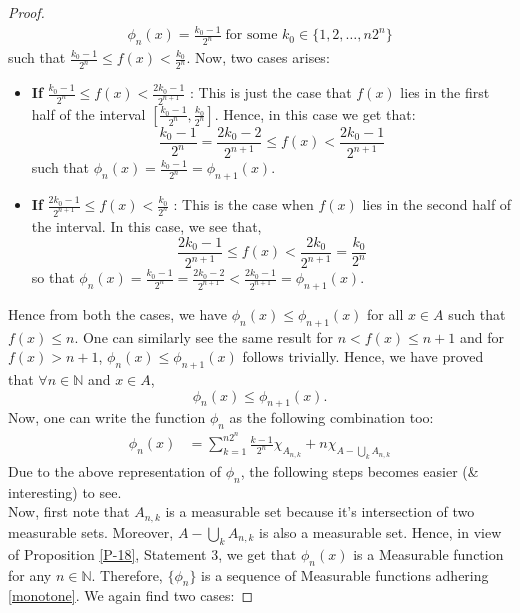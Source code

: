 \documentclass{article}
\theoremstyle{definition}
\theoremstyle{remark}
\theoremstyle{definition}
\theoremstyle{definition}
\theoremstyle{definition}
\newcommand{\bunion}{\bigcup}
\newcommand{\N}{\mathbb{N}}
\begin{document}
\begin{proof}
\begin{equation*}
		\begin{split}
			\phi_n(x) = \frac{k_0  -1}{2^n}\;\text{for some }k_0 \in \{1,2,\dots,n2^n\}
		\end{split}
	\end{equation*}
	such that $ \frac{k_0-1 }{2^n}\le f(x) < \frac{k_0}{2^n} $. Now, two cases arises:
	\begin{itemize}
		\item {\textbf{If} $ \frac{k_0-1}{2^n} \le f(x) < \frac{2k_0 -1}{2^{n+1}} $ : This is just the case that $ f(x) $ lies in the first half of the interval $ \left [\frac{k_0-1}{2^n}, \frac{k_0}{2^n}\right ] $. Hence, in this case we get that:
			\[\frac{k_0-1}{2^n} = \frac{2k_0 - 2}{2^{n+1}} \le f(x) < \frac{2k_0 - 1}{2^{n+1}}\]
			such that $ \phi_n(x) = \frac{k_0-1}{2^n} = \phi_{n+1}(x) $.	
		}
		\item {\textbf{If} $ \frac{2k_0 -1}{2^{n+1}} \le f(x) < \frac{k_0}{2^n}$ : This is the case when $ f(x) $ lies in the second half of the interval. In this case, we see that,
			\[\frac{2k_0 -1}{2^{n+1}} \le f(x) < \frac{2k_0}{2^{n+1}} = \frac{k_0}{2^{n}}\]
			so that $ \phi_n(x) = \frac{k_0 -1}{2^n} = \frac{2k_0 -2}{2^{n+1}} < \frac{2k_0 -1}{2^{n+1}} = \phi_{n+1}(x) $.
		}
	\end{itemize}
	Hence from both the cases, we have $ \phi_n(x) \le \phi_{n+1} (x) $ for all $ x \in A$ such that $ f(x)\le n $. One can similarly see the same result for $ n<f(x) \le n+1$ and for $ f(x) >n+1 $, $ \phi_n(x) \le \phi_{n+1}(x) $ follows trivially. Hence, we have proved that $ \forall n\in \N $ and $ x\in A $, 
	\begin{equation}
		\label{monotone}
		\phi_n(x) \le \phi_{n+1}(x).
	\end{equation}
	Now, one can write the function $ \phi_n $ as the following combination too:
	\begin{equation}
		\begin{split}
			\phi_n(x) &= \sum_{k=1}^{n2^n} \frac{k-1}{2^n}\chi_{A_{n,k}} + n\chi_{A - \bunion_k A_{n,k}}
		\end{split}
	\end{equation}
	Due to the above representation of $ \phi_n $, the following steps becomes easier (\& interesting) to see.\\
	Now, first note that $ A_{n,k} $ is a measurable set because it's intersection of two measurable sets. Moreover, $ A- \bunion_{k}A_{n,k} $ is also a measurable set. Hence, in view of Proposition \ref{P-18}, Statemen\textit{\textit{}}t 3, we get that $ \phi_n(x) $ is a Measurable function for any $ n\in \N $. Therefore, $ \{\phi_n\} $ is a sequence of Measurable functions adhering \eqref{monotone}. We again find two cases:

\end{proof}
\end{document}
